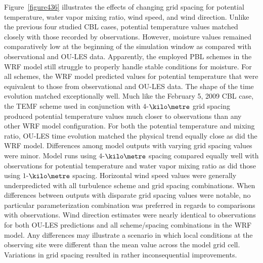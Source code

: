 Figure~\ref{figure436} illustrates the effects of changing grid spacing for potential temperature, water vapor mixing ratio, wind speed, and wind direction. Unlike the previous four studied CBL cases, potential temperature values matched closely with those recorded by observations. However, moisture values remained comparatively low at the beginning of the simulation window as compared with observational and OU-LES data. Apparently, the employed PBL schemes in the WRF model still struggle to properly handle stable conditions for moisture. For all schemes, the WRF model predicted values for potential temperature that were equivalent to those from observational and OU-LES data. The shape of the time evolution matched exceptionally well. Much like the February 5, 2009 CBL case, the TEMF scheme used in conjunction with $4$-$\kilo\metre$ grid spacing produced potential temperature values much closer to observations than any other WRF model configuration. For both the potential temperature and mixing ratio, OU-LES time evolution matched the physical trend equally close as did the WRF model. Differences among model outputs with varying grid spacing values were minor. Model runs using $4$-$\kilo\metre$ spacing compared equally well with observations for potential temperature and water vapor mixing ratio as did those using $1$-$\kilo\metre$ spacing. Horizontal wind speed values were generally underpredicted with all turbulence scheme and grid spacing combinations. When differences between outputs with disparate grid spacing values were notable, no particular parameterization combination was preferred in regards to comparisons with observations. Wind direction estimates were nearly identical to observations for both OU-LES predictions and all scheme\slash spacing combinations in the WRF model. Any differences may illustrate a scenario in which local conditions at the observing site were different than the mean value across the model grid cell. Variations in grid spacing resulted in rather inconsequential improvements.


